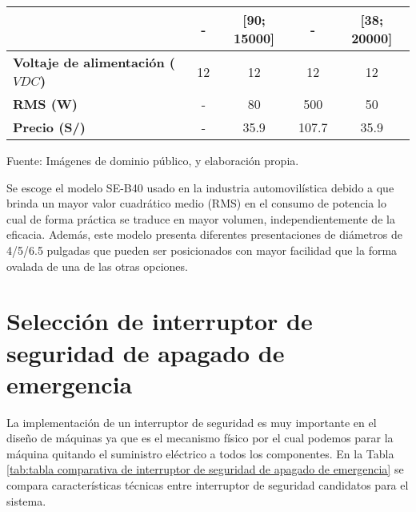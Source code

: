 \begin{mytable}[H]
\begin{tabular}{l|c|c|c|c|}
{		}& - & [90; 15000] & - & [38; 20000]  \\ \hline
		\multicolumn{1}{|l|}{
			\begin{minipage}{\myforthmaxsizeofcontenttable}	
				\textbf{Voltaje de alimentación ($VDC$)}
			\end{minipage}
		} & 12 & 12 & 12 & 12 \\ \hline
		\multicolumn{1}{|l|}{\textbf{RMS (W)}} & -  & 80 & 500 & 50 \\ \hline
		\multicolumn{1}{|l|}{\textbf{Precio (S/)}} & - & 35.9 & 107.7 & 35.9 \\ \hline
	\end{tabular}
	\begin{myflushcenteraftertable}	
		Fuente: Imágenes de dominio público, %
		y elaboración propia.
	\end{myflushcenteraftertable}
\end{mytable}

Se escoge el modelo SE-B40 usado en la industria automovilística debido a que brinda un mayor valor cuadrático medio (RMS) en el consumo de potencia lo cual de forma práctica se traduce en mayor volumen, independientemente de la eficacia. Además, este modelo presenta diferentes presentaciones de diámetros de 4/5/6.5 pulgadas que pueden ser posicionados con mayor facilidad que la forma ovalada de una de las otras opciones.

\section{Selección de interruptor de seguridad de apagado de emergencia}

La implementación de un interruptor de seguridad es muy importante en el diseño de máquinas ya que es el mecanismo físico por el cual podemos parar la máquina quitando el suministro eléctrico a todos los componentes. En la Tabla \ref{tab:tabla comparativa de interruptor de seguridad de apagado de emergencia} se compara características técnicas entre interruptor de seguridad candidatos para el sistema.

